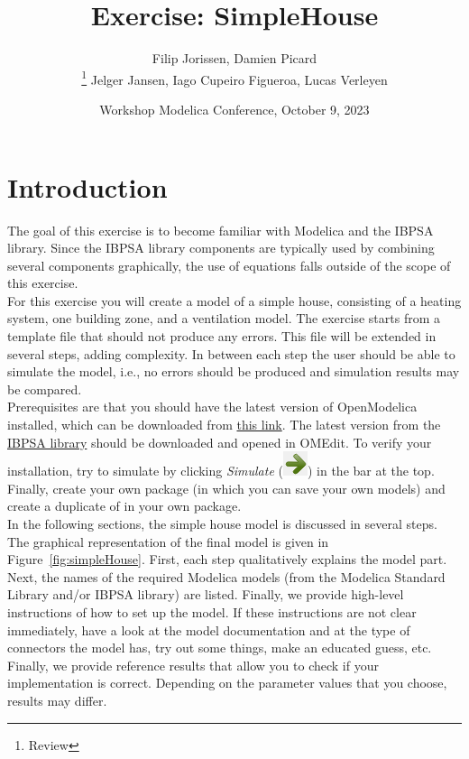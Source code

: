 \documentclass[10pt,a4paper]{article}
\begin{document}
\title{Exercise: SimpleHouse}
\author{Filip Jorissen, Damien Picard\\ \thanks{Review} Jelger Jansen, Iago Cupeiro Figueroa, Lucas Verleyen}
\date{Workshop Modelica Conference, October 9, 2023}
\maketitle


\doclicenseThis


\section*{Introduction}
The goal of this exercise is to become familiar with Modelica and the IBPSA library. Since the IBPSA library components are typically used by combining several components graphically, the use of equations falls outside of the scope of this exercise.\\

For this exercise you will create a model of a simple house, consisting of a heating system, one building zone, and a ventilation model. The exercise starts from a template file that should not produce any errors. This file will be extended in several steps, adding complexity. In between each step the user should be able to simulate the model, i.e., no errors should be produced and simulation results may be compared.\\

Prerequisites are that you should have the latest version of OpenModelica installed, which can be downloaded from \href{https://openmodelica.org/}{this link}. The latest version from the \href{https://github.com/ibpsa/modelica-ibpsa}{IBPSA library} should be downloaded and opened in OMEdit. To verify your installation, try to simulate  by clicking \textit{Simulate} (\includegraphics[scale=0.35]{img/simulate.png}) in the bar at the top. Finally, create your own package (in which you can save your own models) and create a duplicate of  in your own package.\\

In the following sections, the simple house model is discussed in several steps. The graphical representation of the final model is given in Figure~\ref{fig:simpleHouse}. First, each step qualitatively explains the model part. Next, the names of the required Modelica models (from the Modelica Standard Library and/or IBPSA library) are listed. Finally, we provide high-level instructions of how to set up the model. If these instructions are not clear immediately, have a look at the model documentation and at the type of connectors the model has, try out some things, make an educated guess, etc. Finally, we provide reference results that allow you to check if your implementation is correct. Depending on the parameter values that you choose, results may differ.\\
\end{document}
